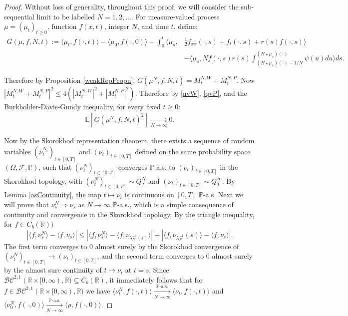 \documentclass{article}
\newcommand{\B}[1]{\mathbb{#1}}
\newcommand{\C}[1]{\mathcal{#1}}
\begin{document}
\begin{proof}
    Without loss of generality, throughout this proof, we will consider the sub-sequential limit to be labelled $N=1,2,\ldots$. For measure-valued process $\mu = (\mu_t)_{t\geq 0}$, function $f(x,t)$, integer $N$, and time $t$, define:
    \begin{align*}G(\mu,f,N,t):=\langle \mu_t,f(\cdot,t)\rangle - \langle \mu_0,f(\cdot,0)\rangle - \int_0^t \langle \mu_s,&\frac12 f_{xx}(\cdot,s) + f_t(\cdot,s) + r(s)f(\cdot,s)\rangle \\
    &- \big\langle \mu_s,Nf(\cdot,s)r(s)\int_{(H\star \mu_s)(\cdot)-1/N}^{(H\star \mu_s)(\cdot)}\psi(u)du\big\rangle ds.\end{align*}

    Therefore by Proposition \ref{weakRepPropn}, $G(\mu^N,f,N,t)=M_t^{N,W}+M_t^{N,P}$. Now $|M_t^{N,W}+M_t^{N,P}|^2 \leq 4(|M_t^{N,W}|^2+|M_t^{N,P}|^2)$. Therefore by \eqref{qvW}, \eqref{qvP}, and the Burkholder-Davis-Gundy inequality, for every fixed $t\geq 0$:
    \begin{align}\label{EGto0}\B{E}[G(\mu^N,f,N,t)^2]\xrightarrow[N\to\infty]{}0.\end{align}


    Now by the Skorokhod representation theorem, there exists a sequence of random variables $(\nu_t^{N_i})_{t\in [0,T]}$ and $(\nu_t)_{t\in [0,T]}$ defined on the same probability space $(\Omega, \C{F},\B{P})$, such that $(\nu_t^{N})_{t\in [0,T]}$ converges $\B{P}$-a.s. to $(\nu_t)_{t\in [0,T]}$ in the Skorokhod topology, with $(\nu_t^{N})_{t\in [0,T]}\sim Q_T^{N}$ and $(\nu_t)_{t\in [0,T]}\sim Q^\infty_T$. By Lemma \ref{asContinuity}, the map $t\mapsto\nu_t$ is continuous on $[0,T]$ $\B{P}$-a.s. Next we will prove that $\nu_s^N\Rightarrow\nu_s$ as $N\to\infty$ $\B{P}$-a.s., which is a simple consequence of continuity and convergence in the Skorokhod topology. By the triangle inequality, for $f\in C_b(\B{R}))$
    $$|\langle f,\nu_s^N\rangle-\langle f,\nu_s\rangle| \leq |\langle f,\nu_s^N\rangle- \langle f,\nu_{\lambda_N^{-1}(s)}\rangle| + |\langle f,\nu_{\lambda_N^{-1}}(s)\rangle-\langle f,\nu_s\rangle|.$$
    The first term converges to $0$ almost surely by the Skorokhod convergence of $(\nu^N_t)_{t\in [0,T]} \to (\nu_t)_{t\in [0,T]}$, and the second term converges to $0$ almost surely by the almost sure continuity of $t\mapsto\nu_t$ at $t=s$. Since $\C{BC}^{2,1}(\B{R}\times [0,\infty),\B{R})\subseteq C_b(\B{R})$, it immediately follows that for $f\in \C{BC}^{2,1}(\B{R}\times [0,\infty),\B{R})$ we have $\langle \nu_t^N, f(\cdot,t)\rangle \xrightarrow[N\to\infty]{\B{P}\text{-a.s.}}\langle \nu_t,f(\cdot,t)\rangle$ and $\langle \nu_0^N,f(\cdot,0)\rangle \xrightarrow[N\to\infty]{\B{P}\text{-a.s.}}\langle \rho,f(\cdot,0)\rangle$.
    

\end{proof}
\end{document}
